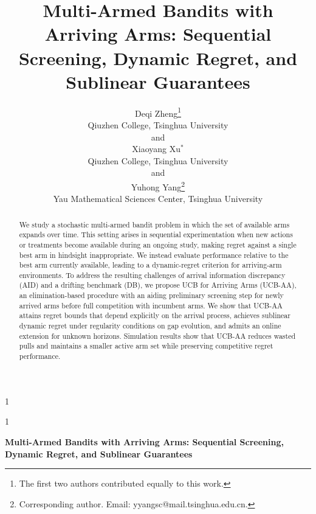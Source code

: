 \documentclass[11pt]{article}
\newcommand{\anon}{1}
\def\spacingset#1{%
  \renewcommand{\baselinestretch}{#1}\small\normalsize
}
\begin{document}
\def\spacingset#1{\renewcommand{\baselinestretch}%
{#1}\small\normalsize} \spacingset{1}




\anon
{
  \title{\bf Multi-Armed Bandits with Arriving Arms: Sequential Screening, Dynamic Regret, and Sublinear Guarantees}
  \author{Deqi Zheng\thanks{
    The first two authors contributed equally to this work.}\\
    Qiuzhen College, Tsinghua University \\
    and \\
    Xiaoyang Xu$^{\ast}$ \\
    Qiuzhen College, Tsinghua University\\
    and \\
    Yuhong Yang\thanks{
    Corresponding author. Email: yyangsc@mail.tsinghua.edu.cn.}\hspace{.2cm}\\
    Yau Mathematical Sciences Center, Tsinghua University
    }
  \maketitle
} \fi

\anon
{
  \bigskip
  \bigskip
  \bigskip
  \begin{center}
    {\LARGE\bf Multi-Armed Bandits with Arriving Arms: Sequential Screening, Dynamic Regret, and Sublinear Guarantees}
\end{center}
  \medskip
} \fi

\bigskip
\begin{abstract}
We study a stochastic multi-armed bandit problem in which the set of available arms expands over time. This setting arises in sequential experimentation when new actions or treatments become available during an ongoing study, making regret against a single best arm in hindsight inappropriate. We instead evaluate performance relative to the best arm currently available, leading to a dynamic-regret criterion for arriving-arm environments. To address the resulting challenges of arrival information discrepancy (AID) and a drifting benchmark (DB), we propose UCB for Arriving Arms (UCB-AA), an elimination-based procedure with an aiding preliminary screening step for newly arrived arms before full competition with incumbent arms. We show that UCB-AA attains regret bounds that depend explicitly on the arrival process, achieves sublinear dynamic regret under regularity conditions on gap evolution, and admits an online extension for unknown horizons. Simulation results show that UCB-AA reduces wasted pulls and maintains a smaller active arm set while preserving competitive regret performance.
\end{abstract}
\end{document}
